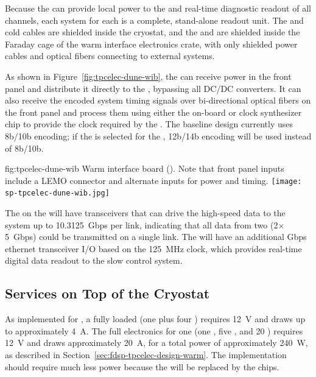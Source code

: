 Because the  can provide local power to the  and real-time diagnostic readout of all channels,
each  system for each  is a complete, stand-alone readout unit. The  and cold cables are shielded
inside the cryostat, and the  and  are shielded inside the Faraday cage of the warm interface
electronics crate, with only shielded power cables and optical fibers connecting to external systems.

As shown in Figure~\ref{fig:tpcelec-dune-wib}, the  can receive  power in the front panel and distribute it directly to the , bypassing all DC/DC converters.
It can also receive the encoded system timing signals over bi-directional optical
fibers on the front panel and process them using either
the on-board  or clock synthesizer chip to provide the clock required by the .
The baseline  design currently uses 8b/10b encoding; if the    is selected for
the  , 12b/14b encoding will be used instead of 8b/10b.

\begin{dunefigure}
{fig:tpcelec-dune-wib}
{Warm interface board (). Note that front panel inputs include a LEMO connector and alternate inputs for  power and timing.}
\texttt{[image: sp-tpcelec-dune-wib.jpg]}
\end{dunefigure}

The  on the  will have
transceivers that can drive the high-speed data to the  system up to
10.3125~Gbps per link, indicating that all data from
two  (2$\times$5~Gbps) could be transmitted on a single link.
The  will have an additional Gbps ethernet transceiver I/O based on the \SI{125}{MHz} clock, which 
provides real-time digital data readout to the slow control system.

\subsection{Services on Top of the Cryostat}
\label{sec:fdsp-tpcelec-design-services}

As implemented for , a fully loaded  (one  plus four ) requires
\SI{12}{V} and draws up to approximately \SI{4}{A}. The full electronics for one  (one , five , and \num{20} ) 
requires \SI{12}{V} and draws approximately \SI{20}{A}, for a total power of approximately \SI{240}{W}, as 
described in Section~\ref{sec:fdsp-tpcelec-design-warm}. The  implementation should require much 
less power because the  will be replaced by the  chips.

